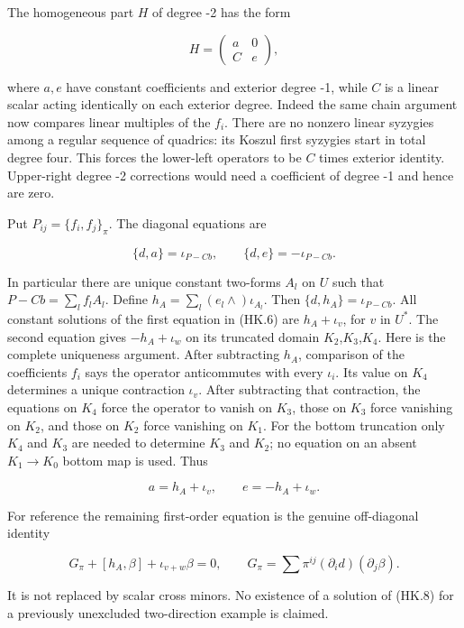 The homogeneous part \(H\) of degree -2 has the form

\[
 H=\begin{pmatrix}a&0\\C&e\end{pmatrix},
 \tag{HK.5}
\]

where \(a,e\) have constant coefficients and exterior degree -1, while \(C\)
is a linear scalar acting identically on each exterior degree. Indeed
the same chain argument now compares linear multiples of the \(f_i\).
There are no nonzero linear syzygies among a regular sequence of quadrics:
its Koszul first syzygies start in total degree four. This forces the
lower-left operators to be \(C\) times exterior identity. Upper-right degree
-2 corrections would need a coefficient of degree -1 and hence are zero.

Put \(P_{ij}=\{f_i,f_j\}_\pi\). The diagonal equations are

\[
 \{d,a\}=\iota_{P-Cb},\qquad
 \{d,e\}=-\iota_{P-Cb}.
 \tag{HK.6}
\]

In particular there are unique constant two-forms \(A_l\) on \(U\) such that
\(P-Cb=\sum_l f_l A_l\). Define \(h_A=\sum_l(e_l\wedge)\iota_{A_l}\). Then
\(\{d,h_A\}=\iota_{P-Cb}\). All constant solutions of the first equation in (HK.6)
are \(h_A+\iota_v\), for \(v\) in \(U^*\). The second equation gives \(-h_A+\iota_w\) on its
truncated domain \(K_2\),\(K_3\),\(K_4\). Here is the complete uniqueness argument.
After subtracting \(h_A\), comparison of the coefficients \(f_i\) says the
operator anticommutes with every \(\iota_i\). Its value on \(K_4\) determines a
unique contraction \(\iota_v\). After subtracting that contraction, the
equations on \(K_4\) force the operator to vanish on \(K_3\), those on \(K_3\) force
vanishing on \(K_2\), and those on \(K_2\) force vanishing on \(K_1\). For the bottom
truncation only \(K_4\) and \(K_3\) are needed to determine \(K_3\) and \(K_2\); no equation
on an absent \(K_1\to K_0\) bottom map is used. Thus

\[
 a=h_A+\iota_v,\qquad e=-h_A+\iota_w.
 \tag{HK.7}
\]

For reference the remaining first-order equation is the genuine
off-diagonal identity

\[
 G_\pi+[h_A,\beta]+\iota_{v+w}\beta=0,
 \qquad
 G_\pi=\sum\pi^{ij}(\partial_i d)(\partial_j\beta).
 \tag{HK.8}
\]

It is not replaced by scalar cross minors. No existence of a solution
of (HK.8) for a previously unexcluded two-direction example is claimed.

